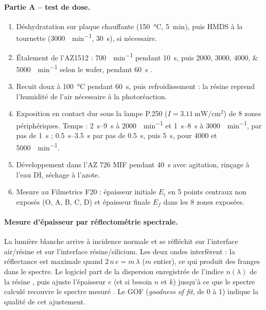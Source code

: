 \paragraph{Partie A -- test de dose.}
\begin{enumerate}
  \item Déshydratation sur plaque chauffante (\qty{150}{\celsius}, \qty{5}{\minute}), puis HMDS à la tournette (\qty{3000}{\tour\per\minute}, \qty{30}{\second}), si nécessaire.
  \item Étalement de l'AZ1512 : \qty{700}{\tour\per\minute} pendant \qty{10}{\second}, puis \numlist{2000;3000;4000;5000}~\unit{\tour\per\minute} selon le wafer, pendant \qty{60}{\second} \cite{prot1}.
  \item Recuit doux à \qty{100}{\celsius} pendant \qty{60}{\second}, puis refroidissement : la résine reprend l'humidité de l'air nécessaire à la photoréaction.
  \item Exposition en contact dur sous la lampe P.250 ($I = \qty{3,11}{\milli\watt\per\centi\metre\squared}$) de 8 zones périphériques. Temps : \qtyrange{2}{9}{\second} à \qty{2000}{\tour\per\minute} et \qtyrange{1}{8}{\second} à \qty{3000}{\tour\per\minute}, par pas de \qty{1}{\second} \cite{prot1} ; \qtyrange{0,5}{3,5}{\second} par pas de \qty{0,5}{\second}, puis \qty{5}{\second}, pour 4000 et \qty{5000}{\tour\per\minute}.
  \item Développement dans l'AZ 726 MIF pendant \qty{40}{\second} avec agitation, rinçage à l'eau DI, séchage à l'azote.
  \item Mesure au Filmetrics F20 : épaisseur initiale $E_i$ en 5 points centraux non exposés (O, A, B, C, D) et épaisseur finale $E_f$ dans les 8 zones exposées.
\end{enumerate}

\paragraph{Mesure d'épaisseur par réflectométrie spectrale.}
La lumière blanche arrive à incidence normale et se réfléchit sur l'interface air/résine et sur l'interface résine/silicium. Les deux ondes interfèrent : la réflectance est maximale quand $2\,n\,e = m\,\lambda$ ($m$ entier), ce qui produit des franges dans le spectre. Le logiciel part de la dispersion enregistrée de l'indice $n(\lambda)$ de la résine \cite{intro}, puis ajuste l'épaisseur $e$ (et si besoin $n$ et $k$) jusqu'à ce que le spectre calculé recouvre le spectre mesuré \cite{prot1}. Le GOF (\emph{goodness of fit}, de 0 à 1) indique la qualité de cet ajustement.

